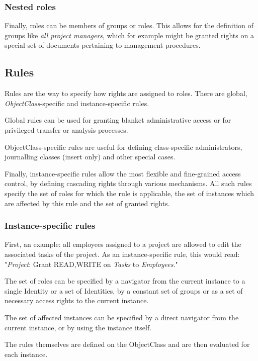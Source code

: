 \subsubsection{Nested roles}

Finally, roles can be members of groups or roles. This allows for the definition
of groups like \emph{all project managers}, which for example might be granted
rights on a special set of documents pertaining to management procedures.

\subsection{Rules}

Rules are the way to specify how rights are assigned to roles. There are global,
\emph{ObjectClass}-specific and instance-specific rules. 

Global rules can be used for granting blanket administrative access or for
privileged transfer or analysis processes.

ObjectClass-specific rules are useful for defining class-specific
administrators, journalling classes (insert only) and other special cases.

Finally, instance-specific rules allow the most flexible and fine-grained access
control, by defining cascading rights through various mechanisms. All such rules
specify the set of roles for which the rule is applicable, the set of instances
which are affected by this rule and the set of granted rights.

\subsubsection{Instance-specific rules}

First, an example: all employees assigned to a project are allowed to edit the
associated tasks of the project. As an instance-specific rule, this would read:
"\emph{Project}: Grant READ,WRITE on \emph{Tasks} to \emph{Employees}."

The set of roles can be specified by a navigator from the current instance to a
single Identity or a set of Identities, by a constant set of groups or as a set
of necessary access rights to the current instance.

The set of affected instances can be specified by a direct navigator from the
current instance, or by using the instance itself.

The rules themselves are defined on the ObjectClass and are then evaluated for
each instance.


